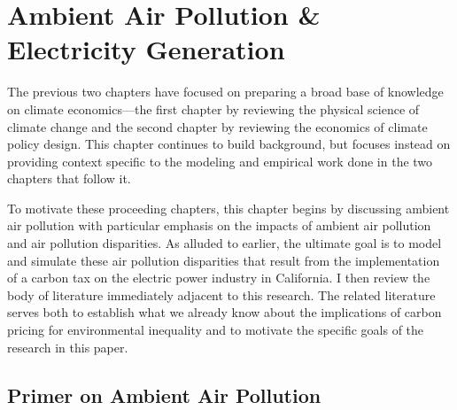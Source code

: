 \newpage
\section{Ambient Air Pollution \& Electricity Generation}

The previous two chapters have focused on preparing a broad base of knowledge on climate economics---the first chapter by reviewing the physical science of climate change and the second chapter by reviewing the economics of climate policy design. This chapter continues to build background, but focuses instead on providing context specific to the modeling and empirical work done in the two chapters that follow it. 

To motivate these proceeding chapters, this chapter begins by discussing ambient air pollution with particular emphasis on the impacts of ambient air pollution and air pollution disparities. As alluded to earlier, the ultimate goal is to model and simulate these air pollution disparities that result from the implementation of a carbon tax on the electric power industry in California. %
I then review the body of literature immediately adjacent to this research. The related literature serves both to establish what we already know about the implications of carbon pricing for environmental inequality and to motivate the specific goals of the research in this paper. 

\subsection{Primer on Ambient Air Pollution}

